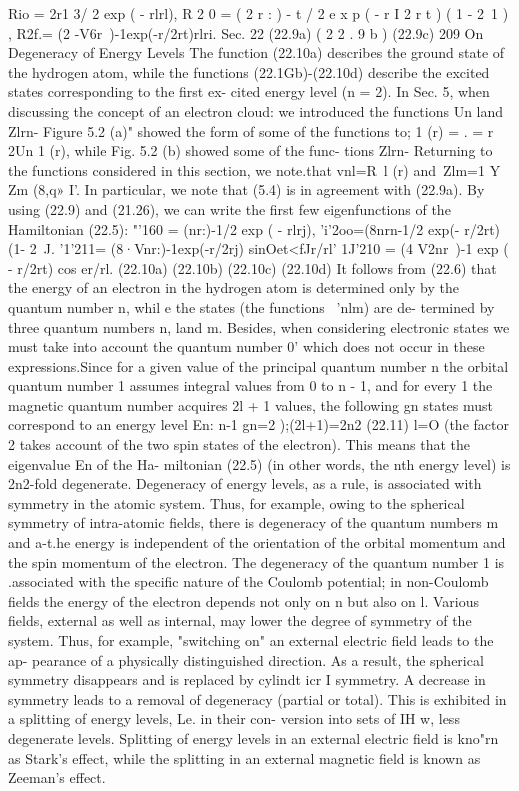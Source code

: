 \documentclass[a4paper,sfsidenotes,colorlinks=true]{tufte-book}
\numberwithin{equation}{section}
\numberwithin{figure}{section}
\begin{document}
{{{{{Rio =	2r1 3/ 2 exp ( - rlrl), R 2 0 = ( 2 r : ) - t / 2 e x p ( - r I 2 r t ) ( 1 - 2~1 ) , R2f.= (2 -V6r~)-1exp(-r/2rt)rlri.
Sec. 22
(22.9a) ( 2 2 . 9 b ) (22.9c)
209
On Degeneracy of Energy Levels
The function (22.10a) describes the ground state of the
hydrogen atom, while the functions (22.1Gb)-(22.10d) describe the excited states corresponding to the first ex- cited energy level (n = 2).
In Sec. 5, when discussing the concept of an electron cloud: we introduced the functions Un land Zlrn- Figure 5.2 (a)" showed	the	form	of	some	of	the	functions	to; 1	(r)	= . = r 2Un 1 (r), while Fig. 5.2 (b) showed some of the func- tions Zlrn- Returning to the functions considered in this section, we note.that vnl=R~l (r) and~Zlm=1 Y Zm (8,q» I'. In particular, we note that (5.4) is in agreement with (22.9a).
By using (22.9) and (21.26), we can write the first few eigenfunctions of the Hamiltonian (22.5):
"'160 = (nr:)-1/2 exp ( - rlrj), 'i'2oo=(8nrn-1/2 exp(- r/2rt) (1- 2~J.
'1'211= (8·Vnr:)-1exp(-r/2rj) sinOet<fJr/rl' 1J'210 = (4 V2nr~)-1 exp ( -	r/2rt) cos er/rl.
(22.10a)
(22.10b)
(22.10c)
(22.10d)
It follows from (22.6) that the energy of an electron in the hydrogen atom is determined only by the quantum number n, whil e the states (the functions ~'nlm) are de- termined by three quantum numbers n, land m. Besides, when considering electronic states we must take into account the quantum number 0' which does not occur in these expressions.Since for a given value of the principal quantum number n the orbital quantum number 1 assumes integral values from 0 to n - 1, and for every 1 the
magnetic quantum number acquires 2l + 1 values, the following gn states must correspond to an energy level En:
n-1 gn=2 );(2l+1)=2n2	(22.11)
l=O
(the factor 2 takes account of the two spin states of the electron). This means that the eigenvalue En of the Ha- miltonian (22.5) (in other words, the nth energy level) is 2n2-fold degenerate.
Degeneracy of energy levels, as a rule, is associated with symmetry in the atomic system. Thus, for example, owing to the spherical symmetry of intra-atomic fields, there is degeneracy of the quantum numbers m and a-t.he energy is independent of the orientation of the orbital momentum and the spin momentum of the electron. The degeneracy of the quantum number 1 is .associated with the specific nature of the Coulomb potential; in non-Coulomb fields
the energy of the electron depends not only on n but also on l. Various fields, external as well as internal, may lower the degree of symmetry of the system. Thus, for example, "switching on" an external electric field leads to the ap- pearance of a physically distinguished direction. As a result, the spherical symmetry disappears and is replaced by cylindt icr I symmetry. A decrease in symmetry leads to a removal of degeneracy (partial or total). This is exhibited in a splitting of energy levels, Le. in their con- version into sets of IH w, less degenerate levels. Splitting of energy levels in an external electric field is kno"rn as Stark's effect, while the splitting in an external magnetic field is known as Zeeman's effect.
}}}}}
\end{document}
